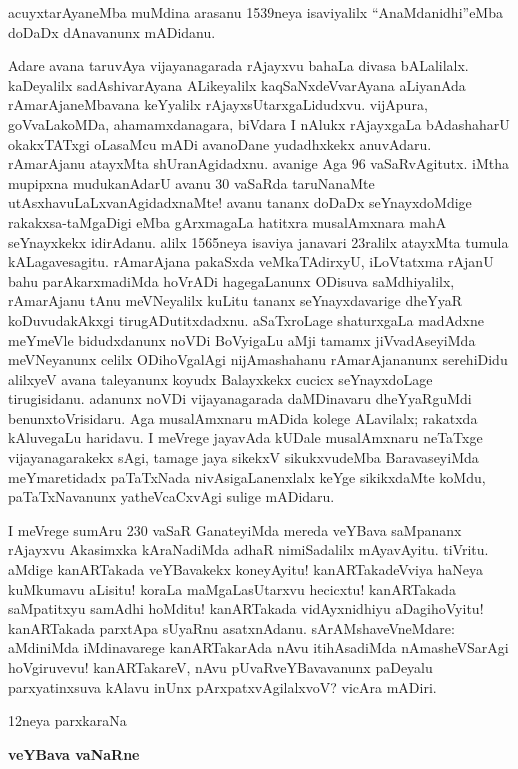 \documentclass[11pt,a4size]{article}
\begin{document}
acuyxtarAyaneMba muMdina arasanu 1539neya isaviyalilx
``AnaMdanidhi''eMba doDaDx dAnavanunx mADidanu.

Adare avana taruvAya vijayanagarada rAjayxvu bahaLa divasa bALalilalx.
kaDeyalilx sadAshivarAyana ALikeyalilx kaqSaNxdeVvarAyana aLiyanAda
rAmarAjaneMbavana keYyalilx rAjayxsUtarxgaLidudxvu. vijApura,
goVvaLakoMDa, ahamamxdanagara, biVdara I nAlukx rAjayxgaLa bAdashaharU
okakxTATxgi oLasaMcu mADi avanoDane yudadhxkekx anuvAdaru. rAmarAjanu
atayxMta shUranAgidadxnu. avanige Aga 96 vaSaRvAgitutx. iMtha mupipxna
mudukanAdarU avanu 30 vaSaRda taruNanaMte
utAsxhavuLaLxvanAgidadxnaMte! avanu tananx doDaDx seYnayxdoMdige
rakakxsa-taMgaDigi eMba gArxmagaLa hatitxra musalAmxnara mahA
seYnayxkekx idirAdanu. alilx 1565neya isaviya janavari 23ralilx
atayxMta tumula kALagavesagitu. rAmarAjana pakaSxda veMkaTAdirxyU,
iLoVtatxma rAjanU bahu parAkarxmadiMda hoVrADi hagegaLanunx ODisuva
saMdhiyalilx, rAmarAjanu tAnu meVNeyalilx kuLitu tananx
seYnayxdavarige dheYyaR koDuvudakAkxgi tirugADutitxdadxnu. aSaTxroLage
shaturxgaLa madAdxne meYmeVle bidudxdanunx noVDi BoVyigaLu aMji tamamx
jiVvadAseyiMda meVNeyanunx celilx ODihoVgalAgi nijAmashahanu
rAmarAjananunx serehiDidu alilxyeV avana taleyanunx koyudx Balayxkekx
cucicx seYnayxdoLage tirugisidanu. adanunx noVDi vijayanagarada
daMDinavaru dheYyaRguMdi benunxtoVrisidaru. Aga musalAmxnaru mADida
kolege ALavilalx; rakatxda kAluvegaLu haridavu. I meVrege jayavAda
kUDale musalAmxnaru neTaTxge vijayanagarakekx sAgi, tamage jaya
sikekxV sikukxvudeMba BaravaseyiMda meYmaretidadx paTaTxNada
nivAsigaLanenxlalx keYge sikikxdaMte koMdu, paTaTxNavanunx
yatheVcaCxvAgi sulige mADidaru.

I meVrege sumAru 230 vaSaR GanateyiMda mereda veYBava saMpananx
rAjayxvu Akasimxka kAraNadiMda adhaR nimiSadalilx
mAyavAyitu. tiVritu. aMdige kanARTakada veYBavakekx koneyAyitu!
kanARTakadeVviya haNeya kuMkumavu aLisitu! koraLa maMgaLasUtarxvu
hecicxtu! kanARTakada saMpatitxyu samAdhi hoMditu! kanARTakada
vidAyxnidhiyu aDagihoVyitu! kanARTakada parxtApa sUyaRnu
asatxnAdanu. sArAMshaveVneMdare: aMdiniMda iMdinavarege kanARTakarAda
nAvu itihAsadiMda nAmasheVSarAgi hoVgiruvevu! kanARTakareV, nAvu
pUvaRveYBavavanunx paDeyalu parxyatinxsuva kAlavu inUnx
pArxpatxvAgilalxvoV? vicAra mADiri.

\bigskip

\begin{center}
{\Huge 12neya parxkaraNa}

\smallskip
\textbf{\LARGE veYBava vaNaRne}
\end{center} 
\end{document}
